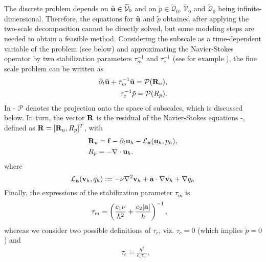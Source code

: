 The discrete problem depends on $\tilde{{\bf u}} \in \widetilde{\mathcal{V}}_0$ and on $\tilde{p}\in \widetilde{\mathcal{Q}}_0$,  $\widetilde{\mathcal{V}}_0$ and $\widetilde{\mathcal{Q}}_0$ being infinite-dimensional. Therefore, the equations for $\tilde{{\bf u}}$ and $\tilde{p}$ obtained after applying the two-scale decomposition cannot be directly solved, but some modeling steps are needed to obtain a feasible method. Considering the subscale as a time-dependent variable of the problem (see below) and approximating the Navier-Stokes operator by two stabilization parameters $\tau_m^{-1}$ and $\tau_c^{-1}$ (see for example \cite{codina_time_2007}), the fine scale problem can be written as
\begin{align}
\label{eq-C2_vms_velo_sgs}
\partial_t\tilde{{\bf u}}+\tau_m^{-1}\tilde{{\bf u}}=\mathcal{P}({\bf R}_u),\\
\label{eq-C2_vms_press_sgs}
\tau_c^{-1}\tilde{p}=\mathcal{P}(R_p).
\end{align}
In - $\mathcal{P}$ denotes the projection onto the space of subscales, which is discussed below. In turn, the vector ${\bf R}$ is the residual of the Navier-Stokes equations -, defined as ${\bf R}=[{\bf R}_u,R_p]^T$, with
\begin{align}
\label{eq-C2_vms_Ru}
&{\bf R}_u={\bf f}-\partial_t{\bf u}_h-\mathcal{L}_{{\bf a}}({\bf u}_h,p_h),\\
\label{eq-C2_vms_Rp}
&R_p=-\nabla\cdot{\bf u}_h.
\end{align}
where
\begin{equation}
\label{eq-C2_vms_operator}
\mathcal{L}_{{\bf a}}({\bf v}_h,q_h):=-\nu\nabla^2{\bf v}_h+{\bf a}\cdot\nabla{\bf v}_h+\nabla q_h
\end{equation}
Finally, the expressions of the stabilization parameter $\tau_m$ is 
\begin{align}
\label{eq-C2_vms_tau_m}
&\tau_m=\left(\frac{c_1\nu}{h^2}+\frac{c_2|{\bf a}|}{h}\right)^{-1},
\end{align}
whereas we consider two possible definitions of $\tau_c$, viz. $\tau_c = 0$ (which implies $\tilde{p} = 0$) and 
\begin{align}
\label{eq-C2_vms_tau_c}
&\tau_c=\frac{h^2}{c_1\tau_m},
\end{align}
